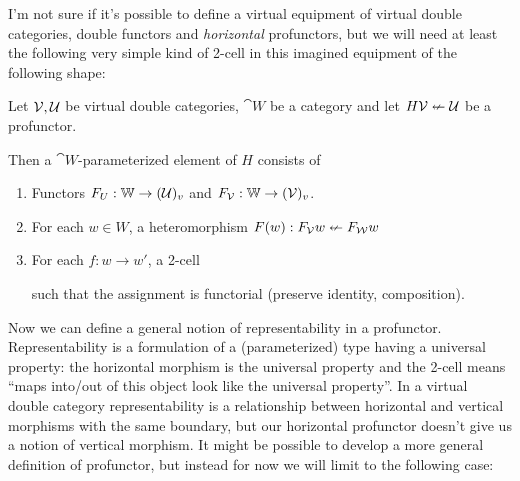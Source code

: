 \documentclass{article}
\begin{document}
I'm not sure if it's possible to define a virtual equipment of virtual
double categories, double functors and \emph{horizontal} profunctors,
but we will need at least the following very simple kind of 2-cell in
this imagined equipment of the following shape:


\begin{definition}
  Let $\mathcal {V,U}$ be virtual double categories, $\cat W$ be a
  category and let $H \mathcal V \nleftarrow \mathcal U$ be a profunctor.

  Then a $\cat W$-parameterized element of $H$ consists of
  \begin{enumerate}
  \item Functors $F_U : \mathbb W \to (\mathcal U)_v$ and $F_{\mathcal V} :
    \mathbb W \to (\mathcal V)_v$.
  \item For each $w \in W$, a heteromorphism $F(w) : F_{\mathcal V} w
    \nleftarrow F_{\mathcal W} w$
  \item For each $f : w \to w'$, a 2-cell
    such that the assignment is functorial (preserve identity,
    composition).
  \end{enumerate}
\end{definition}

Now we can define a general notion of representability in a
profunctor.
%
Representability is a formulation of a (parameterized) type having a
universal property: the horizontal morphism is the universal property
and the 2-cell means ``maps into/out of this object look like the
universal property''.
%
In a virtual double category representability is a relationship
between horizontal and vertical morphisms with the same boundary, but
our horizontal profunctor doesn't give us a notion of vertical
morphism.
%
It might be possible to develop a more general definition of
profunctor, but instead for now we will limit to the following case:
\end{document}
